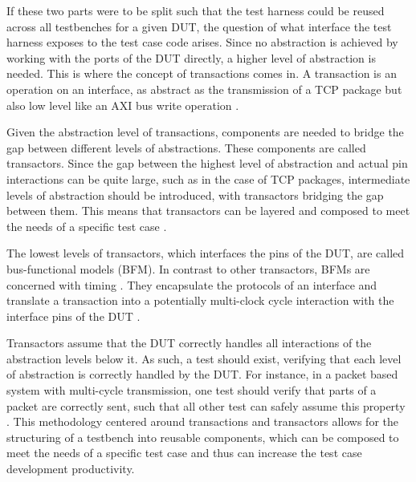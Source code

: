 If these two parts were to be split such that the test harness could be reused across all testbenches for a given
DUT, the question of what interface the test harness exposes to the test case code arises. Since no abstraction is
achieved by working with the ports of the DUT directly, a higher level of abstraction is needed. This is where the
concept of transactions comes in. A transaction is an operation on an interface, as abstract as the transmission of a
TCP package but also low level like an AXI bus write operation \cite[Ch. 1]{bergeron2005verification}.

Given the abstraction level of transactions, components are needed to bridge the gap between different levels of abstractions. These components are called transactors. Since the gap between the highest level of
abstraction and actual pin interactions can be quite large, such as in the case of TCP packages, intermediate levels
of abstraction should be introduced, with transactors bridging the gap between them. This means that transactors can
be layered and composed to meet the needs of a specific test case \cite[Ch. 4]{bergeron2012writing}.

The lowest levels of transactors, which interfaces the pins of the DUT, are called bus-functional models (BFM). In
contrast to other transactors, BFMs are concerned with timing \cite[Ch. 4]{bergeron2012writing}. They encapsulate the
protocols of an interface and translate a transaction into a potentially multi-clock cycle interaction with the
interface pins of the DUT \cite[Ch. 3]{salemi2013uvm}.

Transactors assume that the DUT correctly handles all interactions of the abstraction levels below it. As such, a
test should exist, verifying that each level of abstraction is correctly handled by the DUT. For instance, in a
packet based system with multi-cycle transmission, one test should verify that parts of a packet are correctly sent,
such that all other test can safely assume this property \cite[Ch. 6]{bergeron2012writing}. This methodology centered
around transactions and transactors allows for the structuring of a testbench into reusable components, which can be
composed to meet the needs of a specific test case and thus can increase the test case development productivity.

